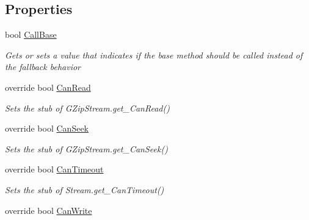 \subsection*{Properties}
\begin{DoxyCompactItemize}
\item 
bool \hyperlink{class_system_1_1_i_o_1_1_compression_1_1_fakes_1_1_stub_g_zip_stream_a335bd28c42a57b916e074fc614e5319f}{Call\-Base}
\begin{DoxyCompactList}\small\item\em Gets or sets a value that indicates if the base method should be called instead of the fallback behavior\end{DoxyCompactList}\item 
override bool \hyperlink{class_system_1_1_i_o_1_1_compression_1_1_fakes_1_1_stub_g_zip_stream_abaf7b67d4d95ece3b0cddc85d918a1e1}{Can\-Read}
\begin{DoxyCompactList}\small\item\em Sets the stub of G\-Zip\-Stream.\-get\-\_\-\-Can\-Read()\end{DoxyCompactList}\item 
override bool \hyperlink{class_system_1_1_i_o_1_1_compression_1_1_fakes_1_1_stub_g_zip_stream_aca57ec9905140d649154cf73399e4bd4}{Can\-Seek}
\begin{DoxyCompactList}\small\item\em Sets the stub of G\-Zip\-Stream.\-get\-\_\-\-Can\-Seek()\end{DoxyCompactList}\item 
override bool \hyperlink{class_system_1_1_i_o_1_1_compression_1_1_fakes_1_1_stub_g_zip_stream_abc05b9015de1ec4e50a7750e79931f05}{Can\-Timeout}
\begin{DoxyCompactList}\small\item\em Sets the stub of Stream.\-get\-\_\-\-Can\-Timeout()\end{DoxyCompactList}\item 
override bool \hyperlink{class_system_1_1_i_o_1_1_compression_1_1_fakes_1_1_stub_g_zip_stream_a5167e91b2b13058a3220af1e116aad58}{Can\-Write}

\end{DoxyCompactItemize}
